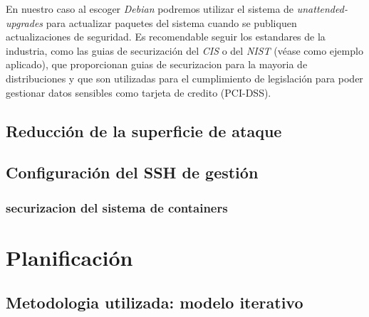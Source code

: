 En nuestro caso al escoger \emph{Debian} podremos utilizar el sistema de \emph{unattended-upgrades} para actualizar paquetes del sistema cuando se publiquen actualizaciones de seguridad. Es recomendable seguir
los estandares de la industria, como las guias de securización del \emph{CIS} o del \emph{NIST} (véase \cite{ovh-debian-cis} como ejemplo aplicado), que proporcionan guias de securizacion para la mayoria de distribuciones y que son utilizadas para el cumplimiento de legislación para poder gestionar datos sensibles como tarjeta de credito (PCI-DSS). 

\subsection{Reducción de la superficie de ataque}

\subsection{Configuración del SSH de gestión}



\subsubsection{securizacion del sistema de containers}




\section{Planificación}



\subsection{Metodologia utilizada: modelo iterativo}

